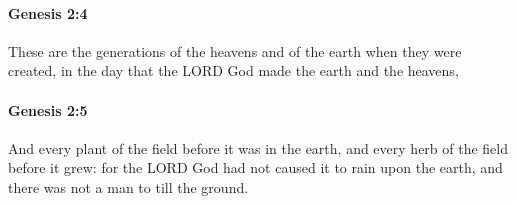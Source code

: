 		\paragraph{Genesis 2:4} %
			\label{GENESIS-2-4}

			These are the generations of the heavens and of the earth when they were created, in the day that the LORD God made the earth and the heavens,


		\paragraph{Genesis 2:5} %
			\label{GENESIS-2-5}

			And every plant of the field before it was in the earth, and every herb of the field before it grew: for the LORD God had not caused it to rain upon the earth, and there was not a man to till the ground.


